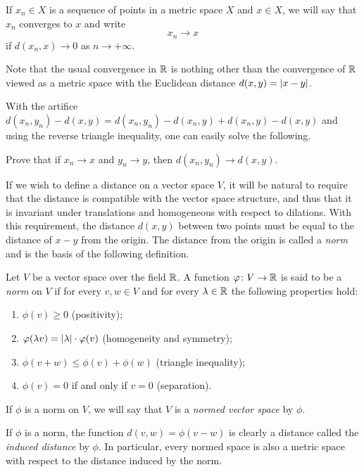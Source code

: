 \begin{definition}[convergence]%
  \label{def:convergenza_metrica}%
\mymark{*}%
If $x_n \in X$ is a sequence of points in a metric space $X$
and $x\in X$, we will say that $x_n$ converges to $x$ and write
\[
  x_n \to x
\]
if $d(x_n,x)\to 0$ as $n\to +\infty$.
\end{definition}

Note that the usual convergence in ${\mathbb R}$ is nothing other than the convergence
of ${\mathbb R}$ viewed as a metric space with the Euclidean distance $d(x,y) =
{\left|x-y\right|}$.

With the artifice $d(x_n,y_n) - d(x,y) = d(x_n,y_n) - d(x_n,y) + d(x_n,y) -
d(x,y)$ and using the reverse triangle inequality, one can easily solve the
following.

\begin{exercise}
Prove that if $x_n\to x$ and $y_n\to y$, then $d(x_n,y_n) \to d(x,y)$.
\end{exercise}

If we wish to define a distance on a vector space $V$, it will be natural to
require that the distance is compatible with the vector space structure, and
thus that it is invariant under translations and homogeneous with respect to
dilations. With this requirement, the distance $d(x,y)$ between two points must
be equal to the distance of $x-y$ from the origin. The distance from the origin
is called a \emph{norm} and is the basis of the following definition.

\begin{definition}
\mymark{*}
\label{def:norma}
Let $V$ be a vector space over the field ${\mathbb R}$.
A function $\varphi \colon V\to {\mathbb R}$ is said to be a \emph{norm}%
%
 on $V$ if
for every $v,w\in V$ and for every $\lambda \in {\mathbb R}$
the following properties hold:
\begin{enumerate}
\item
  $\phi(v) \ge 0$ (positivity);
\item
  $\varphi(\lambda v) = {\left|\lambda\right|} \cdot \varphi(v)$ (homogeneity and symmetry);
\item
  $\phi(v+w) \le \phi(v) + \phi(w)$
  (triangle inequality);
\item
  $\phi(v)=0$ if and only if $v=0$ (separation).
\end{enumerate}

If $\phi$ is a norm on $V$, we will say that
$V$
is a \emph{normed vector space}%
%
 by $\phi$.

If $\phi$ is a norm, the function $d(v,w) = \phi(v-w)$
is clearly a distance called the
\emph{induced distance}
%
%
by $\phi$.
In particular, every normed space is also a metric space with respect to the
distance induced by the norm.
\end{definition}


